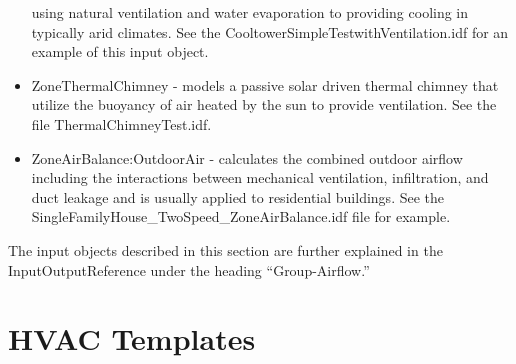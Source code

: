 \begin{itemize}
using natural ventilation and water evaporation to providing cooling
in typically arid climates. See the CooltowerSimpleTestwithVentilation.idf
for an example of this input object.
\item ZoneThermalChimney - models a passive solar driven thermal chimney
that utilize the buoyancy of air heated by the sun to provide ventilation.
See the file ThermalChimneyTest.idf.
\item ZoneAirBalance:OutdoorAir - calculates the combined outdoor airflow
including the interactions between mechanical ventilation, infiltration,
and duct leakage and is usually applied to residential buildings.
See the SingleFamilyHouse\_TwoSpeed\_ZoneAirBalance.idf file for example.
\end{itemize}
The input objects described in this section are further explained
in the InputOutputReference under the heading ``Group-Airflow.''

\section{HVAC Templates}

